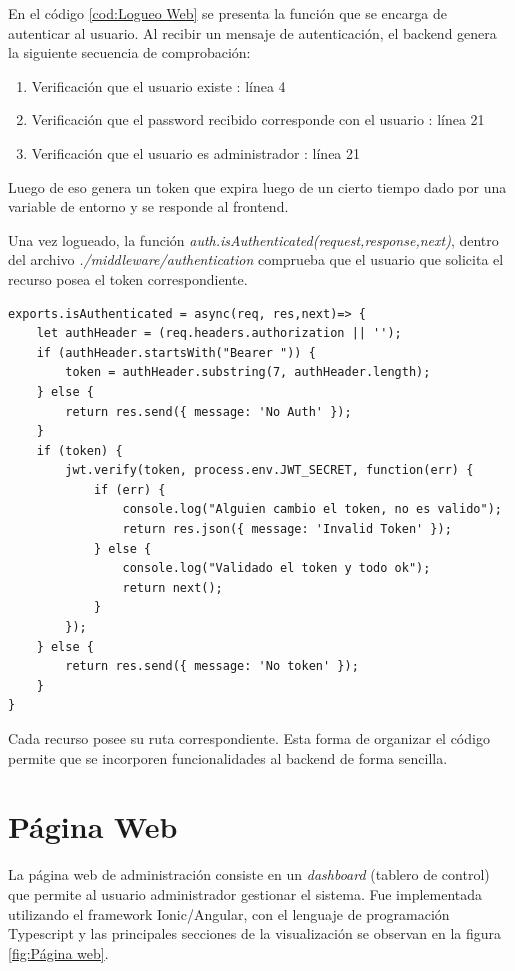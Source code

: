 En el código \ref{cod:Logueo Web} se presenta la función que se encarga de autenticar al usuario. Al recibir un mensaje de autenticación, el backend genera la siguiente secuencia de comprobación:
\begin{enumerate}
\item Verificación que el usuario existe : línea 4
\item Verificación que el password recibido corresponde con el usuario : línea 21
\item Verificación que el usuario es administrador : línea 21
\end{enumerate}

Luego de eso genera un token que expira luego de un cierto tiempo dado por una variable de entorno y se responde al frontend.

Una vez logueado, la función \textit{auth.isAuthenticated(request,response,next)}, dentro del archivo \textit{./middleware/authentication} comprueba que el usuario que solicita el recurso posea el token correspondiente.
\begin{lstlisting}[label=cod: Autorización,caption=  Control de token.]
exports.isAuthenticated = async(req, res,next)=> {
    let authHeader = (req.headers.authorization || '');
    if (authHeader.startsWith("Bearer ")) {
        token = authHeader.substring(7, authHeader.length);
    } else {
        return res.send({ message: 'No Auth' });
    }
    if (token) {
        jwt.verify(token, process.env.JWT_SECRET, function(err) {
            if (err) {
                console.log("Alguien cambio el token, no es valido");
                return res.json({ message: 'Invalid Token' });
            } else {
                console.log("Validado el token y todo ok");
                return next();
            }
        });
    } else {
        return res.send({ message: 'No token' });
    }
}
\end{lstlisting}

Cada recurso posee su ruta correspondiente. Esta forma de organizar el código permite que se incorporen funcionalidades al backend de forma sencilla.

\pagebreak

\section{Página Web}

La página web de administración consiste en un \textit{dashboard} (tablero de control) que permite al usuario administrador gestionar el sistema.
Fue implementada utilizando el framework Ionic/Angular, con el lenguaje de programación Typescript y las principales secciones de la visualización se observan en la figura \ref{fig:Página web}.

